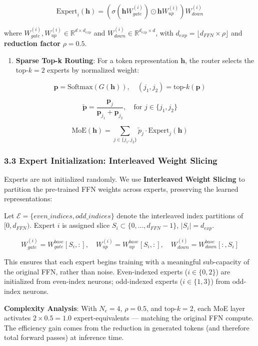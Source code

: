 \[\text{Expert}_i(\mathbf{h}) = \left(\sigma(\mathbf{h} W_{gate}^{(i)}) \odot \mathbf{h} W_{up}^{(i)}\right) W_{down}^{(i)}\]

where \(W_{gate}^{(i)}, W_{up}^{(i)} \in \mathbb{R}^{d \times d_{exp}}\)
and \(W_{down}^{(i)} \in \mathbb{R}^{d_{exp} \times d}\), with
\(d_{exp} = \lfloor d_{FFN} \times \rho \rfloor\) and \textbf{reduction
factor} \(\rho = 0.5\).

\begin{enumerate}
\def\labelenumi{\arabic{enumi}.}
\setcounter{enumi}{2}
\tightlist
\item
  \textbf{Sparse Top-k Routing}: For a token representation
  \(\mathbf{h}\), the router selects the top-\(k = 2\) experts by
  normalized weight:
\end{enumerate}

\[\mathbf{p} = \text{Softmax}(G(\mathbf{h})), \quad (j_1, j_2) = \text{top-}k(\mathbf{p})\]

\[\tilde{\mathbf{p}} = \frac{\mathbf{p}_{j}}{\mathbf{p}_{j_1} + \mathbf{p}_{j_2}}, \quad \text{for } j \in \{j_1, j_2\}\]

\[\text{MoE}(\mathbf{h}) = \sum_{j \in \{j_1, j_2\}} \tilde{p}_j \cdot \text{Expert}_j(\mathbf{h})\]

\subsubsection{3.3 Expert Initialization: Interleaved Weight
Slicing}\label{expert-initialization-interleaved-weight-slicing}

Experts are not initialized randomly. We use \textbf{Interleaved Weight
Slicing} to partition the pre-trained FFN weights across experts,
preserving the learned representations:

Let \(\mathcal{E} = \{even\_indices, odd\_indices\}\) denote the
interleaved index partitions of \([0, d_{FFN})\). Expert \(i\) is
assigned slice \(S_i \subset \{0, \ldots, d_{FFN}-1\}\),
\(|S_i| = d_{exp}\).

\[W_{gate}^{(i)} = W_{gate}^{base}[S_i, :], \quad W_{up}^{(i)} = W_{up}^{base}[S_i, :], \quad W_{down}^{(i)} = W_{down}^{base}[:, S_i]\]

This ensures that each expert begins training with a meaningful
sub-capacity of the original FFN, rather than noise. Even-indexed
experts (\(i \in \{0, 2\}\)) are initialized from even-index neurons;
odd-indexed experts (\(i \in \{1, 3\}\)) from odd-index neurons.

\textbf{Complexity Analysis}: With \(N_e = 4\), \(\rho = 0.5\), and
top-\(k = 2\), each MoE layer activates \(2 \times 0.5 = 1.0\)
expert-equivalents --- matching the original FFN compute. The efficiency
gain comes from the reduction in generated tokens (and therefore total
forward passes) at inference time.

